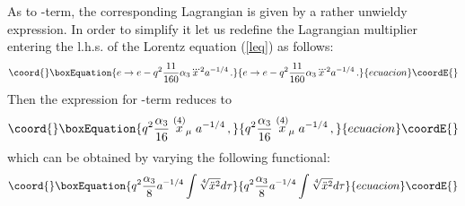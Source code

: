 \documentclass[a4paper,12pt]{article}
\begin{document}
As to \coordHE{}-term, the corresponding Lagrangian is given by a
rather unwieldy expression. In order to simplify it let us
redefine the Lagrangian multiplier \coordHE{} entering the l.h.s. of the
Lorentz equation (\ref{leq}) as follows:
\begin{equation}\coord{}\boxEquation{\label{ree}
    e\rightarrow e-q^2\frac{11}{160}\alpha_3\dddot{x}^2a^{-1/4}\,.
}{e\rightarrow e-q^2\frac{11}{160}\alpha_3\dddot{x}^2a^{-1/4}\,.
}{ecuacion}\coordE{}\end{equation}
Then the expression for \coordHE{}-term reduces to
\begin{equation}\coord{}\boxEquation{\label{reterm}
   q^2 \frac{\alpha_3}{16}\stackrel{(4)}{x}_\mu a^{-1/4}\,,
}{q^2 \frac{\alpha_3}{16}\stackrel{(4)}{x}_\mu a^{-1/4}\,,
}{ecuacion}\coordE{}\end{equation}
which can be obtained by varying the following functional:
\begin{equation}\coord{}\boxEquation{\label{}
    q^2\frac{\alpha_3}8a^{-1/4}\int{\sqrt[4]{\ddot{x}^2}}d\tau
}{q^2\frac{\alpha_3}8a^{-1/4}\int{\sqrt[4]{\ddot{x}^2}}d\tau
}{ecuacion}\coordE{}\end{equation}
\end{document}
